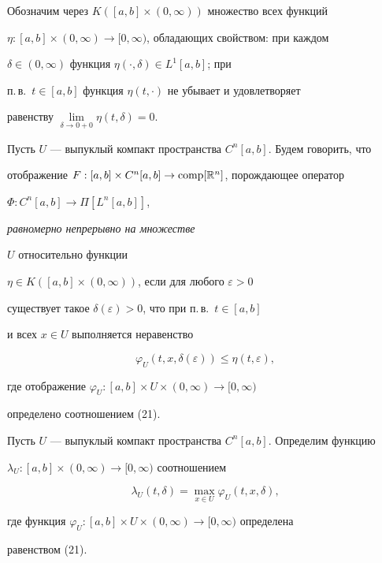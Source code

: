 Обозначим через $K([a,b]\times(0,\infty))$ множество всех функций


$\eta:[a,b]\times(0,\infty)\to[0,\infty)$, обладающих свойством: при каждом


$\delta\in(0,\infty)$ функция $\eta(\cdot,\delta)\in L^1[a,b]$; при


п.\,в.~$t\in [a,b]$ функция $\eta(t,\cdot)$ не убывает и удовлетворяет


равенству $\lim\limits_{\delta\to 0+0}\eta(t,\delta)=0$.





Пусть $U$ --- выпуклый компакт пространства $C^n[a,b]$. Будем говорить, что


отображение $F:[a,b]\times C^n[a,b]\to\operatorname{comp}[\Bbb R^n]$, порождающее оператор


$\Phi:C^n[a,b]\to\Pi[L^n[a,b]]$, {\it равномерно непрерывно на множестве


$U$ относительно функции}


$\eta\in K([a,b]\times(0,\infty))$, если для любого $\varepsilon>0$


существует такое $\delta(\varepsilon)>0$, что при п.\,в.~$t\in[a,b]$


и всех $x\in U$ выполняется неравенство


\begin{equation}


\varphi_U(t,x,\delta(\varepsilon))\le\eta(t,\varepsilon),


\end{equation}


где отображение $\varphi_U:[a,b]\times U\times(0,\infty)\to[0,\infty)$


определено соотношением (21).





Пусть $U$ --- выпуклый компакт пространства $C^n[a,b]$. Определим функцию


$\lambda_U:[a,b]\times(0,\infty)\to[0,\infty)$ соотношением


\begin{equation}


\lambda_U(t,\delta)=\max_{x\in U}\varphi_U(t,x,\delta),


\end{equation}


где функция $\varphi_U:[a,b]\times U\times(0,\infty)\to[0,\infty)$ определена


равенством (21).





